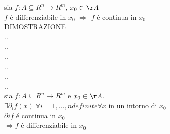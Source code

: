 \proposition
sia $f:A\subseteq R^n\rightarrow R^m$, $x_0\in\AA$\\
$f$ \'e differenziabile in $x_0$ $\Rightarrow$ $f$ \'e continua in $x_0$\\
DIMOSTRAZIONE\\

..\\
..\\
..\\
..\\
..\\
..\\


sia $f:A\subseteq R^n\rightarrow R^m$ e $x_0\in\AA$.\\
$\exists \partial_{i}f(x)\;\forall i=1,...,n definite \forall x$ in un intorno di $x_0$\\
$\partial{i}f$ \'e continua in $x_0$\\
$\Rightarrow f$ \'e differenziabile in $x_0$\\

